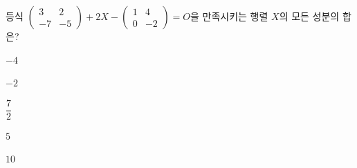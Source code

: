 등식 $\begin{pmatrix} 3 & 2 \\ -7 & -5 \end{pmatrix}+2X-\begin{pmatrix} 1 & 4 \\ 0 & -2 \end{pmatrix}=O$을 만족시키는 행렬 $X$의 모든 성분의 합은? 
\begin{choices32}{\rule[-3ex]{0pt}{8ex}$-4$}{\rule[-3ex]{0pt}{8ex}$-2$}{\rule[-3ex]{0pt}{8ex}$\dfrac{7}{2}$}{\rule[-3ex]{0pt}{8ex}$5$}{\rule[-3ex]{0pt}{8ex}$10$}\end{choices32}
